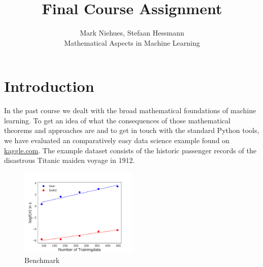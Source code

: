 
\setsansfont{Source Sans Pro}
\setmainfont{Source Sans Pro}

\usepackage[babel, german=quotes]{csquotes} %
\usepackage[backend=biber]{biblatex} %



 
\title{Final Course Assignment \\ }%
\author{Mark Niehues, Stefaan Hessmann \\ %
Mathematical Aspects in Machine Learning} %

\maketitle
 
\section{Introduction}
In the past course we dealt with the broad mathematical foundations of machine learning. To get an idea of what the consequences of those mathematical theorems and approaches are and to get in touch with the standard Python tools, we have evaluated an comparatively easy data science example found on \url{kaggle.com}. The example dataset \cite{Kaggle2017} consists of the historic passenger records of the disastrous Titanic maiden voyage in 1912. 

\begin{figure}
  \centering
    \includegraphics[width=0.5\textwidth]{media_saved/benchmark}
  \caption{Benchmark}
  \label{fig:gull}
\end{figure}

